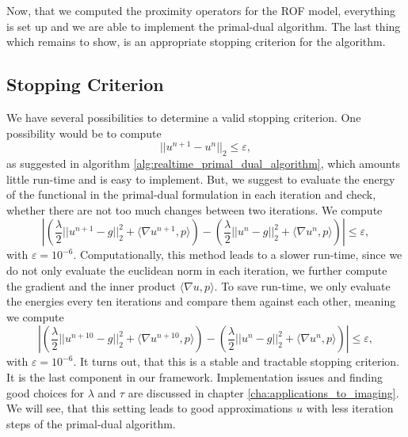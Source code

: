 \documentclass{scrreprt}
\begin{document}
            Now, that we computed the proximity operators for the ROF model, everything is set up and we are able to implement the primal-dual algorithm. The last thing which remains to show, is an appropriate stopping criterion for the algorithm.


        \subsection{Stopping Criterion} %
        \label{sub:stopping_criterion_rof}

            We have several possibilities to determine a valid stopping criterion. One possibility would be to compute
                $$
                    ||u^{n+1} - u^{n}||_{2} \le \varepsilon,
                $$
            as suggested in algorithm \ref{alg:realtime_primal_dual_algorithm}, which amounts little run-time and is easy to implement. But, we suggest to evaluate the energy of the functional in the primal-dual formulation in each iteration and check, whether there are not too much changes between two iterations. We compute
                \begin{equation}
                    \left| \left( \frac{\lambda}{2} ||u^{n+1} - g||_{2}^{2} + \langle \nabla u^{n+1}, p \rangle \right) - \left( \frac{\lambda}{2} ||u^{n} - g||_{2}^{2} + \langle \nabla u^{n}, p \rangle \right) \right| \le \varepsilon,
                    \label{eq:stop_rof_model}
                \end{equation}
            with $\varepsilon = 10^{-6}$. Computationally, this method leads to a slower run-time, since we do not only evaluate the euclidean norm in each iteration, we further compute the gradient and the inner product $\langle \nabla u, p \rangle$. To save run-time, we only evaluate the energies every ten iterations and compare them against each other, meaning we compute
                $$
                    \left| \left( \frac{\lambda}{2} ||u^{n+10} - g||_{2}^{2} + \langle \nabla u^{n+10}, p \rangle \right) - \left( \frac{\lambda}{2} ||u^{n} - g||_{2}^{2} + \langle \nabla u^{n}, p \rangle \right) \right| \le \varepsilon,
                $$
            with $\varepsilon = 10^{-6}$. It turns out, that this is a stable and tractable stopping criterion. It is the last component in our framework. Implementation issues and finding good choices for $\lambda$ and $\tau$ are discussed in chapter \ref{cha:applications_to_imaging}. We will see, that this setting leads to good approximations $u$ with less iteration steps of the primal-dual algorithm.
\end{document}
